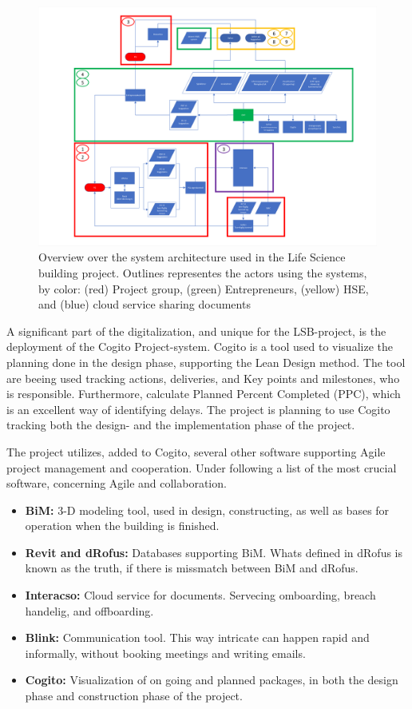 \begin{figure}
    \centering
    \includegraphics[width=\textwidth]{fig/LVB_system-arkitektur.png}
    \caption{Overview over the system architecture used in the Life Science building project. Outlines representes the actors using the systems, by color: (red) Project group, (green) Entrepreneurs, (yellow) HSE, and (blue) cloud service sharing documents}
    \label{fig:LSB_systems}
\end{figure}

A significant part of the digitalization, and unique for the LSB-project, is the deployment of the Cogito Project-system. Cogito is a tool used to visualize the planning done in the design phase, supporting the Lean Design method. The tool are beeing used tracking actions, deliveries, and Key points and milestones, who is responsible. Furthermore, calculate Planned Percent Completed (PPC), which is an excellent way of identifying delays. The project is planning to use Cogito tracking both the design- and the implementation phase of the project.

The project utilizes, added to Cogito, several other software supporting Agile project management and cooperation. Under following a list of the most crucial software, concerning Agile and collaboration. 

\begin{itemize}
    \item {\bf BiM:} 3-D modeling tool, used in design, constructing, as well as bases for operation when the building is finished.
    \item {\bf Revit and dRofus:} Databases supporting BiM. Whats defined in dRofus is known as the truth, if there is missmatch between BiM and dRofus.
    \item {\bf Interacso:} Cloud service for documents. Servecing omboarding, breach handelig, and offboarding. 
    \item {\bf Blink:} Communication tool. This way intricate can happen rapid and informally, without booking meetings and writing emails.
    \item {\bf Cogito:} Visualization of on going and planned packages, in both the design phase and construction phase of the project.
\end{itemize}

